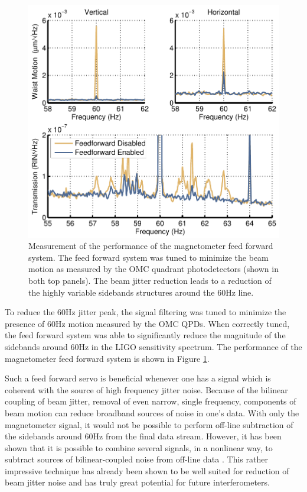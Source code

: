 \begin{figure}
  \begin{center}
  \leavevmode
  \includegraphics{figs-jitter/magffperformance.pdf}
  \end{center}
  \caption[Measurement of the performance of the magnetometer feed forward system.]{Measurement of the performance of the magnetometer feed forward system. The feed forward system was tuned to minimize the beam motion as measured by the OMC quadrant photodetectors (shown in both top panels). The beam jitter reduction leads to a reduction of the highly variable sidebands structures around the 60Hz line.}
  \label{fig:magffperformance}
\end{figure}

To reduce the 60Hz jitter peak, the signal filtering was tuned to minimize the presence of 60Hz motion measured by the OMC QPDs. %
When correctly tuned, the feed forward system was able to significantly reduce the magnitude of the sidebands around 60Hz in the LIGO sensitivity spectrum. %
The performance of the magnetometer feed forward system is shown in Figure \ref{fig:magffperformance}.

Such a feed forward servo is beneficial whenever one has a signal which is coherent with the source of high frequency jitter noise. %
Because of the bilinear coupling of beam jitter, removal of even narrow, single frequency, components of beam motion can reduce broadband sources of noise in one's data. %
With only the magnetometer signal, it would not be possible to perform off-line subtraction of the sidebands around 60Hz from the final data stream. %
However, it has been shown that it is possible to combine several signals, in a nonlinear way, to subtract sources of bilinear-coupled noise from off-line data \cite{G1200462}. %
This rather impressive technique has already been shown to be well suited for reduction of beam jitter noise and has truly great potential for future interferometers.

